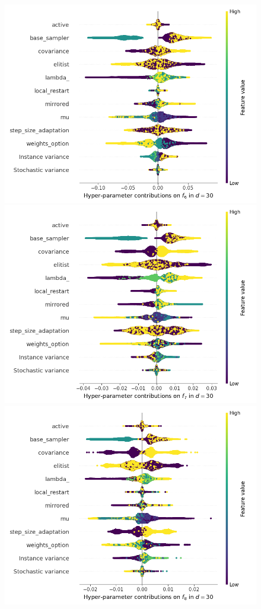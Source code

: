 \begin{figure}[t]
	\includegraphics[height=0.15\textheight,trim=60mm 0mm 30mm 0mm,clip]{cma_img_new/img_summary_f6_d30.png}
	\includegraphics[height=0.15\textheight,trim=60mm 0mm 30mm 0mm,clip]{cma_img_new/img_summary_f7_d30.png}
	\includegraphics[height=0.15\textheight,trim=60mm 0mm 0mm 0mm,clip]{cma_img_new/img_summary_f8_d30.png}

\end{figure}
